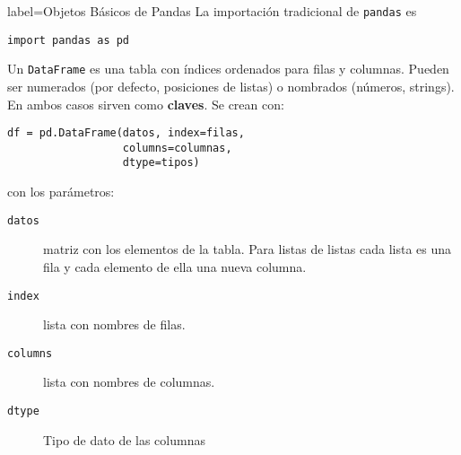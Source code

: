 \begin{contentbox}{label=Objetos Básicos de Pandas}
    La importación tradicional de \texttt{pandas} es
    \begin{center}
        \lstinline!import pandas as pd!
    \end{center}
    
    Un \texttt{DataFrame} es una tabla con índices \alert{ordenados} para filas y columnas. Pueden ser numerados (por defecto, posiciones de listas) o nombrados (números, strings). En ambos casos sirven como \textbf{claves}. Se crean con:
    
    \begin{lstlisting}
df = pd.DataFrame(datos, index=filas, 
                  columns=columnas,
                  dtype=tipos)
    \end{lstlisting}
    
    con los parámetros:
    \begin{description}
    \item[\texttt{datos}] matriz con los elementos de la tabla. Para listas de listas cada lista es una fila y cada elemento de ella una nueva columna.
    \item[\texttt{index}] lista con nombres de filas.
    \item[\texttt{columns}] lista con nombres de columnas.
    \item[\texttt{dtype}] Tipo de dato de las columnas
    \end{description}
\vspace{-13pt}
\end{contentbox}


